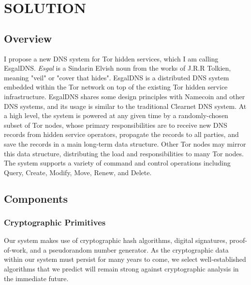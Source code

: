 
\chapter{\uppercase{Solution}}

\section{Overview}

I propose a new DNS system for Tor hidden services, which I am calling EsgalDNS. \textit{Esgal} is a Sindarin Elvish noun from the works of J.R.R Tolkien, meaning "veil" or "cover that hides".\cite{SindarinDict} EsgalDNS is a distributed DNS system embedded within the Tor network on top of the existing Tor hidden service infrastructure. EsgalDNS shares some design principles with Namecoin and other DNS systems, and its usage is similar to the traditional Clearnet DNS system. At a high level, the system is powered at any given time by a randomly-chosen subset of Tor nodes, whose primary responsibilities are to receive new DNS records from hidden service operators, propagate the records to all parties, and save the records in a main long-term data structure. Other Tor nodes may mirror this data structure, distributing the load and responsibilities to many Tor nodes. The system supports a variety of command and control operations including Query, Create, Modify, Move, Renew, and Delete. 

\section{Components}

\subsection{Cryptographic Primitives}

Our system makes use of cryptographic hash algorithms, digital signatures, proof-of-work, and a pseudorandom number generator. As the cryptographic data within our system must persist for many years to come, we select well-established algorithms that we predict will remain strong against cryptographic analysis in the immediate future.

